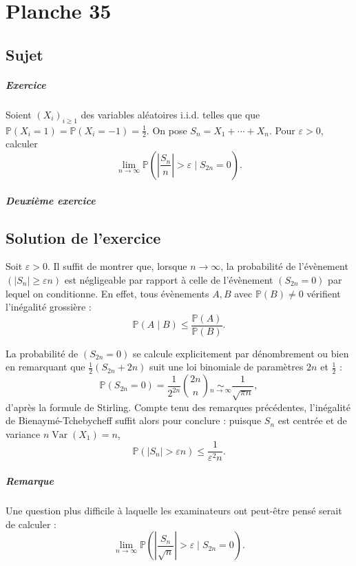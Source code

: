 \chapter{Planche 35}

\section{Sujet}

\paragraph{Exercice}
Soient $(X_i)_{i\geqslant 1}$ des variables aléatoires i.i.d. telles que que $\mathbb P(X_i = 1) = \mathbb P(X_i = -1) = \frac12.$
On pose $S_n = X_1 + \cdots + X_n$.
Pour $\varepsilon > 0$, calculer
\[
\lim_{n\to\infty} \mathbb P\left(\left|\frac{S_n}n\right| > \varepsilon \mid S_{2n} = 0\right).
\]

\paragraph{Deuxième exercice}

\section{Solution de l'exercice}
Soit $\varepsilon > 0$.
Il suffit de montrer que, lorsque $n \to \infty$, la probabilité de l'évènement $(|S_n| \geq \varepsilon n)$ est négligeable par rapport à celle de l'évènement $(S_{2n} = 0)$ par lequel on conditionne. En effet, tous évènements $A,B$ avec $\mathbb P(B) \neq 0$ vérifient l'inégalité grossière :
\[
\mathbb P(A \mid B) \leqslant \frac{\mathbb P(A)}{\mathbb P(B)}.
\]

La probabilité de $(S_{2n} = 0)$ se calcule explicitement par dénombrement ou bien en remarquant que $\frac12(S_{2n}+{2n})$ suit une loi binomiale de paramètres $2n$ et $\frac12$ :
\[
\mathbb P(S_{2n} = 0) = \frac1{2^{2n}}\binom{2n}{n} \underset{n\to\infty}{\sim} \frac 1{\sqrt{\pi n}},
\]
d'après la formule de Stirling. Compte tenu des remarques précédentes, l'inégalité de Bienaymé-Tchebycheff suffit alors pour conclure : puisque $S_n$ est centrée et de variance $n\operatorname{Var}(X_1) = n$,
\[
 \mathbb P\left(|S_n| > \varepsilon n\right) \leqslant \frac{1}{\varepsilon^2 n}.
\]

\paragraph{Remarque}
Une question plus difficile à laquelle les examinateurs ont peut-être pensé serait de calculer :
\[
\lim_{n\to\infty} \mathbb P\left(\left|\frac{S_n}{\sqrt n}\right| > \varepsilon \mid S_{2n} = 0\right).
\]
